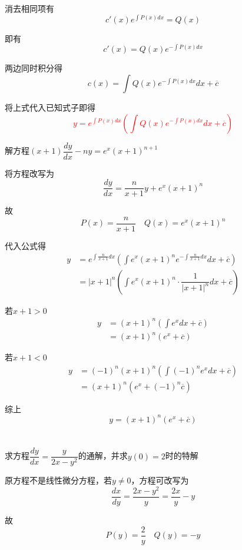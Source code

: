\documentclass[oneside]{book} %
\begin{document}
消去相同项有
$$c'(x)e^{\int P(x) dx} = Q(x)$$

即有
$$c'(x) = Q(x)e^{-\int P(x) dx} $$

两边同时积分得
$$c(x) = \int Q(x)e^{-\int P(x) dx} dx+ \overline{c}$$

将上式代入已知式子即得
\textcolor{red}{$$y = e^{\int P(x) dx}\left(\int Q(x)e^{-\int P(x) dx} dx+ \overline{c}\right) $$}

\noindent {}解方程$(x + 1) \dfrac{dy}{dx} - ny = e^{x}(x + 1)^{n + 1}$

\noindent {}

将方程改写为
$$\frac{dy}{dx} = \frac{n}{x + 1}y + e^{x}(x + 1)^{n}$$

故
$$P(x) = \frac{n}{x + 1} \quad Q(x) = e^{x}(x + 1)^{n}$$

代入公式得
\begin{align*}
    y & = e^{\int \frac{n}{x + 1} dx}\left(\int e^{x}(x + 1)^{n} e^{-\int \frac{n}{x + 1} dx} dx + \overline{c}\right) \\
    & = \left\lvert x + 1 \right\rvert ^{n}\left(\int e^{x}(x + 1)^{n} \cdot \dfrac{1}{\left\lvert x + 1 \right\rvert ^{n}}dx + \overline{c}\right) 
\end{align*}

若$x + 1 > 0$
\begin{align*}
    y & = (x + 1)^{n}\left(\int e^{x}dx + \overline{c}\right) \\
    & = (x + 1)^{n}\left(e^{x} + \overline{c}\right)
\end{align*}

若$x + 1 < 0$
\begin{align*}
    y & = (-1)^{n}(x + 1)^{n}\left(\int (-1)^{n}e^{x}dx + \overline{c}\right) \\
    & = (x + 1)^{n}\left(e^{x} + (-1)^{n}\overline{c}\right)
\end{align*}

综上
$$ y = (x + 1)^{n}\left(e^{x} + \overline{c}\right)$$
\\ \hspace*{\fill} \\
\noindent {}求方程$\dfrac{dy}{dx} = \dfrac{y}{2x - y ^{2}}$的通解，并求$y(0) = 2$时的特解

\noindent {}

原方程不是线性微分方程，若$y \neq 0$，方程可改写为
$$ \frac{dx}{dy} = \frac{2x - y^{2}}{y} = \frac{2x}{y} - y$$

故
$$P(y) = \frac{2}{y} \quad Q(y) = -y$$
\end{document}
